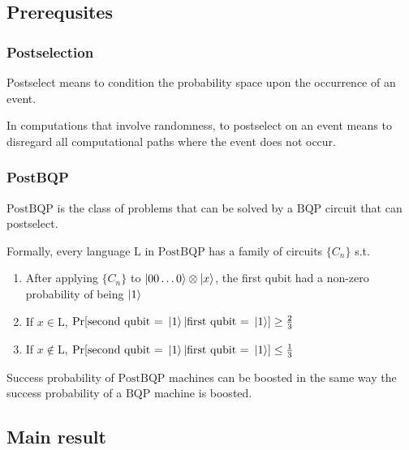 \documentclass[../main.tex]{subfiles}
\begin{document}
\subsection{Prerequsites}

\subsubsection{Postselection}

Postselect means to condition the probability space upon the occurrence of an event.

\noindent In computations that involve randomness, to postselect on an event means to disregard all computational paths where the event does not occur.

\subsubsection{PostBQP}

$\mathrm{PostBQP}$ is the class of problems that can be solved by a $\mathrm{BQP}$ circuit that can postselect.

Formally, every language $\mathrm{L}$ in $\mathrm{PostBQP}$ has a family of circuits $\{C_n\}$ s.t.
\begin{enumerate}
	\item After applying $\{C_n\}$ to $\ket{00\hdots 0}\otimes\ket{x}$, the first qubit had a non-zero probability of being $\ket{1}$
	\item If $x \in \mathrm{L}$, $\mathrm{Pr}[\text{second qubit = } \ket{1} | \text{first qubit = } \ket{1}] \ge \frac{2}{3}$
	\item If $x \not\in \mathrm{L}$, $\mathrm{Pr}[\text{second qubit = } \ket{1} | \text{first qubit = } \ket{1}] \le \frac{1}{3}$
\end{enumerate}

\noindent Success probability of $\mathrm{PostBQP}$ machines can be boosted in the same way the success probability of a $\mathrm{BQP}$ machine is boosted.

\subsection{Main result}
\end{document}
